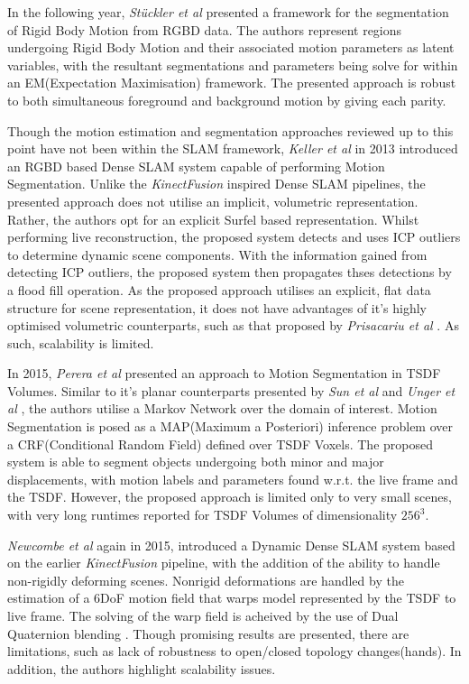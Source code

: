 In the following year, \textit{St{\"u}ckler et al} \cite{Stueckler2013} presented a framework 
for the segmentation of Rigid Body Motion from RGBD data. The authors represent regions undergoing 
Rigid Body Motion and their associated motion parameters as latent variables, with the resultant 
segmentations and parameters being solve for within an EM(Expectation Maximisation) framework. 
The presented approach is robust to both simultaneous foreground and background motion by giving 
each parity.

Though the motion estimation and segmentation approaches reviewed up to this point have not 
been within the SLAM framework, \textit{Keller et al} \cite{Keller2013} in 2013 introduced an 
RGBD based Dense SLAM system capable of performing Motion Segmentation. Unlike the \textit{KinectFusion} 
\cite{Newcombe2011} inspired Dense SLAM pipelines, the presented approach does not utilise an 
implicit, volumetric representation. Rather, the authors opt for an explicit Surfel \cite{Pfister2000} 
based representation. Whilst performing live reconstruction, the proposed system detects and uses ICP 
outliers to determine dynamic scene components. With the information gained from detecting ICP outliers, 
the proposed system then propagates thses detections by a flood fill operation. As the proposed approach 
utilises an explicit, flat data structure for scene representation, it does not have advantages of 
it's highly optimised volumetric counterparts, such as that proposed by \textit{Prisacariu et al} 
\cite{Prisacariu2011}. As such, scalability is limited.

In 2015, \textit{Perera et al} \cite{Perera2015} presented an approach to Motion Segmentation in 
TSDF Volumes. Similar to it's planar counterparts presented by \textit{Sun et al} \cite{Sun2012} 
and \textit{Unger et al} \cite{Unger2012}, the authors utilise a Markov Network over the domain 
of interest. Motion Segmentation is posed as a MAP(Maximum a Posteriori) inference problem over 
a CRF(Conditional Random Field) defined over TSDF Voxels. The proposed system is able to segment 
objects undergoing both minor and major displacements, with motion labels and parameters found 
w.r.t. the live frame and the TSDF. However, the proposed approach is limited only to very small 
scenes, with very long runtimes reported for TSDF Volumes of dimensionality $256^{3}$.

\textit{Newcombe et al} \cite{Newcombe2015} again in 2015, introduced a Dynamic Dense SLAM 
system based on the earlier \textit{KinectFusion} \cite{Newcombe2015} pipeline, with the addition 
of the ability to handle non-rigidly deforming scenes. Nonrigid deformations are handled by the 
estimation of a 6DoF motion field that warps model represented by the TSDF to live frame. The 
solving of the warp field is acheived by the use of Dual Quaternion blending \cite{Kavan2006}. 
Though promising results are presented, there are limitations, such as lack of robustness to 
open/closed topology changes(hands). In addition, the authors highlight scalability issues.


